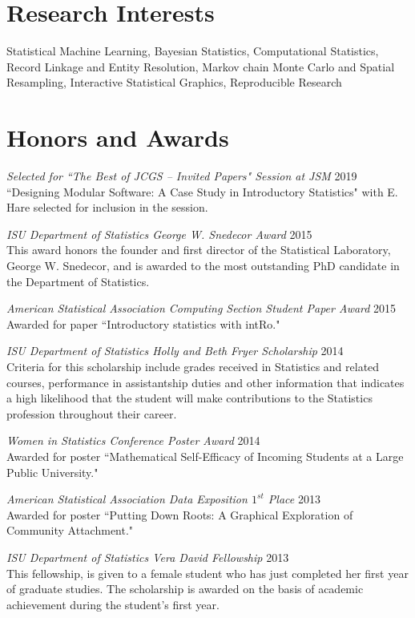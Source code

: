 \documentclass[margin,line]{res}
\begin{document}
\begin{resume}
\section{\sc Research Interests}
Statistical Machine Learning, Bayesian Statistics, Computational Statistics, Record Linkage and Entity Resolution,  Markov chain Monte Carlo and Spatial Resampling, Interactive Statistical Graphics, Reproducible Research

\section{\sc Honors and Awards}
{\em Selected for ``The Best of JCGS -- Invited Papers" Session at JSM } \hfill 2019\\
``Designing Modular Software: A Case Study in Introductory Statistics" with E. Hare selected for inclusion in the session.

{\em ISU Department of Statistics George W. Snedecor Award } \hfill 2015\\
This award honors the founder and first director of the Statistical Laboratory, George W. Snedecor, and is awarded to the most outstanding PhD candidate in the Department of Statistics.

{\em American Statistical Association Computing Section Student Paper Award } \hfill 2015 \\
Awarded for paper ``Introductory statistics with intRo."

{\em ISU Department of Statistics Holly and Beth Fryer Scholarship } \hfill 2014\\
Criteria for this scholarship include grades received in Statistics and related courses, performance in assistantship duties and other information that indicates a high likelihood that the student will make contributions to the Statistics profession throughout their career.

{\em Women in Statistics Conference Poster Award } \hfill 2014\\
Awarded for poster ``Mathematical Self-Efficacy of Incoming Students at a Large Public University."

{\em American Statistical Association Data Exposition $1^{st}$ Place } \hfill 2013\\
Awarded for poster ``Putting Down Roots: A Graphical Exploration of Community Attachment."

{\em ISU Department of Statistics Vera David Fellowship } \hfill 2013\\
This fellowship, is given to a female student who has just completed her first year of graduate studies. The scholarship is awarded on the basis of academic achievement during the student’s first year.


\end{resume}
\end{document}
